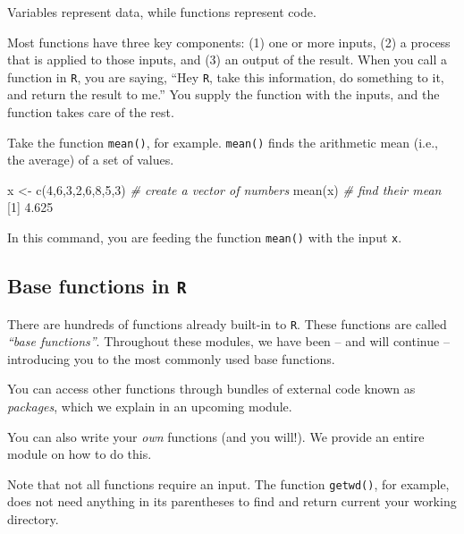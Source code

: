 \documentclass[
]{book}
\newenvironment{Shaded}{\begin{snugshade}}{\end{snugshade}}
\newcommand{\CommentTok}[1]{\textcolor[rgb]{0.56,0.35,0.01}{\textit{#1}}}
\newcommand{\DecValTok}[1]{\textcolor[rgb]{0.00,0.00,0.81}{#1}}
\newcommand{\FloatTok}[1]{\textcolor[rgb]{0.00,0.00,0.81}{#1}}
\newcommand{\FunctionTok}[1]{\textcolor[rgb]{0.00,0.00,0.00}{#1}}
\newcommand{\NormalTok}[1]{#1}
\newcommand{\OtherTok}[1]{\textcolor[rgb]{0.56,0.35,0.01}{#1}}
\begin{document}
Variables represent data, while functions represent code.

Most functions have three key components: (1) one or more inputs, (2) a process that is applied to those inputs, and (3) an output of the result. When you call a function in \texttt{R}, you are saying, ``Hey \texttt{R}, take this information, do something to it, and return the result to me.'' You supply the function with the inputs, and the function takes care of the rest.

Take the function \texttt{mean()}, for example. \texttt{mean()} finds the arithmetic mean (i.e., the average) of a set of values.

\begin{Shaded}
\begin{Highlighting}[]
\NormalTok{x }\OtherTok{\textless{}{-}} \FunctionTok{c}\NormalTok{(}\DecValTok{4}\NormalTok{,}\DecValTok{6}\NormalTok{,}\DecValTok{3}\NormalTok{,}\DecValTok{2}\NormalTok{,}\DecValTok{6}\NormalTok{,}\DecValTok{8}\NormalTok{,}\DecValTok{5}\NormalTok{,}\DecValTok{3}\NormalTok{) }\CommentTok{\# create a vector of numbers}
\FunctionTok{mean}\NormalTok{(x) }\CommentTok{\# find their mean}
\NormalTok{[}\DecValTok{1}\NormalTok{] }\FloatTok{4.625}
\end{Highlighting}
\end{Shaded}

In this command, you are feeding the function \texttt{mean()} with the input \texttt{x}.

\hypertarget{base-functions-in-r}{%
\subsection*{\texorpdfstring{Base functions in \texttt{R}}{Base functions in R}}\label{base-functions-in-r}}

There are hundreds of functions already built-in to \texttt{R}. These functions are called \emph{``base functions''}. Throughout these modules, we have been -- and will continue -- introducing you to the most commonly used base functions.

You can access other functions through bundles of external code known as \emph{packages}, which we explain in an upcoming module.

You can also write your \emph{own} functions (and you will!). We provide an entire module on how to do this.

Note that not all functions require an input. The function \texttt{getwd()}, for example, does not need anything in its parentheses to find and return current your working directory.
\end{document}
